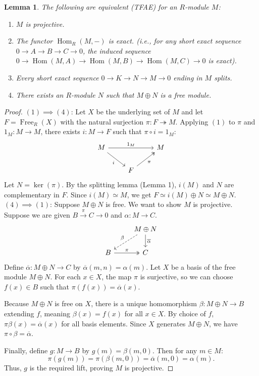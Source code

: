 \documentclass[a4paper,12pt]{article}
\newtheorem{lem}[thm]{Lemma}
\begin{document}
\begin{lem}
    The following are equivalent (TFAE) for an $R$-module $M$:
    \begin{enumerate}
        \item $M$ is projective.
        \item The functor $\operatorname{Hom}_R(M, -)$ is exact. (i.e., for any short exact sequence $0 \to A \to B \to C \to 0$, the induced sequence $0 \to \operatorname{Hom}(M,A) \to \operatorname{Hom}(M,B) \to \operatorname{Hom}(M,C) \to 0$ is exact).
        \item Every short exact sequence $0 \to K \to N \to M \to 0$ ending in $M$ splits.
        \item There exists an $R$-module $N$ such that $M \oplus N$ is a free module.
    \end{enumerate}
\end{lem}

\begin{proof}
    \textbf{$(1) \implies (4)$}: Let $X$ be the underlying set of $M$ and let $F = \operatorname{Free}_R(X)$ with the natural surjection $\pi: F \twoheadrightarrow M$. Applying $(1)$ to $\pi$ and $1_M: M \to M$, there exists $i: M \to F$ such that $\pi \circ i = 1_M$:
    $$
    \begin{tikzcd}
        M \arrow[rr, "1_M"] \arrow[dr, "i"'] & & M \\
        & F \arrow[ur, "\pi"', two heads] &
    \end{tikzcd}
    $$
    Let $N = \ker(\pi)$. By the splitting lemma (Lemma 1), $i(M)$ and $N$ are complementary in $F$. Since $i(M) \simeq M$, we get $F \simeq i(M) \oplus N \simeq M \oplus N$.\\
    \textbf{$(4) \implies (1)$}: Suppose $M \oplus N$ is free. We want to show $M$ is projective. Suppose we are given $B \xrightarrow{\pi} C \to 0$ and $\alpha: M \to C$.
    $$
    \begin{tikzcd}
        & M \oplus N \arrow[dl, "\beta"', dashed] \arrow[d, "\overline{\alpha}"] \\
        B \arrow[r, "\pi", two heads] & C
    \end{tikzcd}
    $$
    Define $\overline{\alpha}: M \oplus N \to C$ by $\overline{\alpha}(m, n) = \alpha(m)$. Let $X$ be a basis of the free module $M \oplus N$. For each $x \in X$, the map $\pi$ is surjective, so we can choose $f(x) \in B$ such that $\pi(f(x)) = \overline{\alpha}(x)$. 
    
    Because $M \oplus N$ is free on $X$, there is a unique homomorphism $\beta: M \oplus N \to B$ extending $f$, meaning $\beta(x) = f(x)$ for all $x \in X$. By choice of $f$, $\pi \beta(x) = \overline{\alpha}(x)$ for all basis elements. Since $X$ generates $M \oplus N$, we have $\pi \circ \beta = \overline{\alpha}$. 
    
    Finally, define $g: M \to B$ by $g(m) = \beta(m, 0)$. Then for any $m \in M$:
    $$
    \pi(g(m)) = \pi(\beta(m, 0)) = \overline{\alpha}(m, 0) = \alpha(m).
    $$
    Thus, $g$ is the required lift, proving $M$ is projective.
\end{proof}
\newpage
\end{document}
